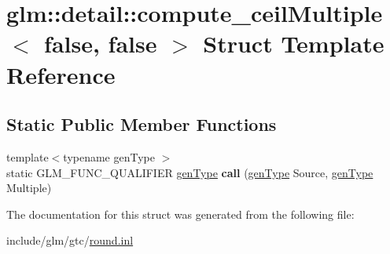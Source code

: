 \hypertarget{structglm_1_1detail_1_1compute__ceilMultiple_3_01false_00_01false_01_4}{}\section{glm\+:\+:detail\+:\+:compute\+\_\+ceil\+Multiple$<$ false, false $>$ Struct Template Reference}
\label{structglm_1_1detail_1_1compute__ceilMultiple_3_01false_00_01false_01_4}
\subsection*{Static Public Member Functions}
\begin{DoxyCompactItemize}
\item 
\mbox{\label{structglm_1_1detail_1_1compute__ceilMultiple_3_01false_00_01false_01_4_a42251f23ffbe25b624948a1128aa9957}} 
{\footnotesize template$<$typename gen\+Type $>$ }\\static G\+L\+M\+\_\+\+F\+U\+N\+C\+\_\+\+Q\+U\+A\+L\+I\+F\+I\+ER \hyperlink{structglm_1_1detail_1_1genType}{gen\+Type} {\bfseries call} (\hyperlink{structglm_1_1detail_1_1genType}{gen\+Type} Source, \hyperlink{structglm_1_1detail_1_1genType}{gen\+Type} Multiple)
\end{DoxyCompactItemize}


The documentation for this struct was generated from the following file\+:\begin{DoxyCompactItemize}
\item 
include/glm/gtc/\hyperlink{round_8inl}{round.\+inl}\end{DoxyCompactItemize}
